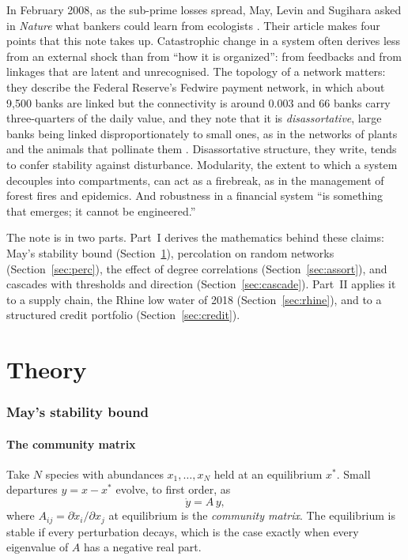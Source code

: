 \documentclass[11pt,a4paper]{article}
\theoremstyle{definition}
\theoremstyle{remark}
\begin{document}
In February 2008, as the sub-prime losses spread, May, Levin and Sugihara asked in \textit{Nature} what bankers could learn from ecologists \citep{MayLevinSugihara2008}. Their article makes four points that this note takes up. Catastrophic change in a system often derives less from an external shock than from ``how it is organized'': from feedbacks and from linkages that are latent and unrecognised. The topology of a network matters: they describe the Federal Reserve's Fedwire payment network, in which about 9,500 banks are linked but the connectivity is around 0.003 and 66 banks carry three-quarters of the daily value, and they note that it is \emph{disassortative}, large banks being linked disproportionately to small ones, as in the networks of plants and the animals that pollinate them \citep{Bascompte2006, Soramaki2007}. Disassortative structure, they write, tends to confer stability against disturbance. Modularity, the extent to which a system decouples into compartments, can act as a firebreak, as in the management of forest fires and epidemics. And robustness in a financial system ``is something that emerges; it cannot be engineered.''

The note is in two parts. Part~I derives the mathematics behind these claims: May's stability bound (Section~\ref{sec:may}), percolation on random networks (Section~\ref{sec:perc}), the effect of degree correlations (Section~\ref{sec:assort}), and cascades with thresholds and direction (Section~\ref{sec:cascade}). Part~II applies it to a supply chain, the Rhine low water of 2018 (Section~\ref{sec:rhine}), and to a structured credit portfolio (Section~\ref{sec:credit}).

\part{Theory}

\section{May's stability bound}
\label{sec:may}

\subsection{The community matrix}

Take $N$ species with abundances $x_1,\dots,x_N$ held at an equilibrium $x^*$. Small departures $y = x - x^*$ evolve, to first order, as
\begin{equation}
\dot y = A\,y ,
\end{equation}
where $A_{ij} = \partial \dot x_i / \partial x_j$ at equilibrium is the \emph{community matrix}. The equilibrium is stable if every perturbation decays, which is the case exactly when every eigenvalue of $A$ has a negative real part.
\end{document}
